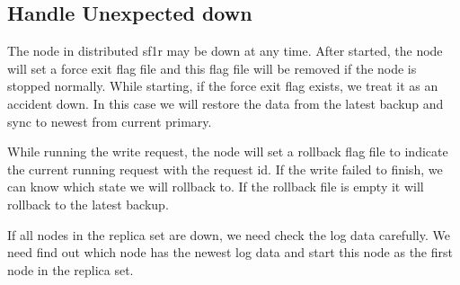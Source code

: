 \subsection{Handle Unexpected down}
The node in distributed sf1r may be down at any time. After started, the node will set a force exit flag file and this flag file will be removed if the node is stopped normally. While starting, if the force exit flag exists, we treat it as an accident down. In this case we will restore the data from the latest backup and sync to newest from current primary.

While running the write request, the node will set a rollback flag file to indicate the current running request with the request id. If the write failed to finish, we can know which state we will rollback to. If the rollback file is empty it will rollback to the latest backup.

If all nodes in the replica set are down, we need check the log data carefully. We need find out which node has the newest log data and start this node as the first node in the replica set.
